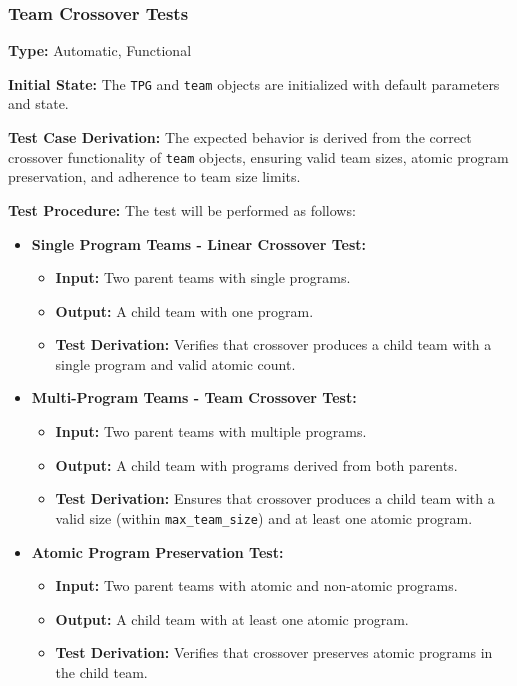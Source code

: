\documentclass[12pt, titlepage]{article}
\begin{document}
\subsubsection{Team Crossover Tests}

\textbf{Type:} Automatic, Functional

\textbf{Initial State:} The \texttt{TPG} and \texttt{team} objects are initialized with default parameters and state.

\textbf{Test Case Derivation:} The expected behavior is derived from the correct crossover functionality of \texttt{team} objects, ensuring valid team sizes, atomic program preservation, and adherence to team size limits.

\textbf{Test Procedure:} The test will be performed as follows:
\begin{itemize}
    \item \textbf{Single Program Teams - Linear Crossover Test:}
    \begin{itemize}
        \item \textbf{Input:} Two parent teams with single programs.
        \item \textbf{Output:} A child team with one program.
        \item \textbf{Test Derivation:} Verifies that crossover produces a child team with a single program and valid atomic count.
    \end{itemize}

    \item \textbf{Multi-Program Teams - Team Crossover Test:}
    \begin{itemize}
        \item \textbf{Input:} Two parent teams with multiple programs.
        \item \textbf{Output:} A child team with programs derived from both parents.
        \item \textbf{Test Derivation:} Ensures that crossover produces a child team with a valid size (within \texttt{max\_team\_size}) and at least one atomic program.
    \end{itemize}

    \item \textbf{Atomic Program Preservation Test:}
    \begin{itemize}
        \item \textbf{Input:} Two parent teams with atomic and non-atomic programs.
        \item \textbf{Output:} A child team with at least one atomic program.
        \item \textbf{Test Derivation:} Verifies that crossover preserves atomic programs in the child team.
    \end{itemize}


\end{itemize}
\end{document}
